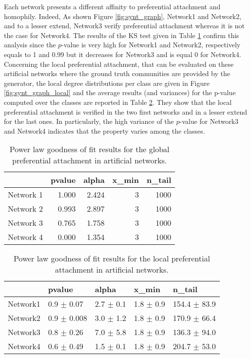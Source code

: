 \documentclass[a4paper, 12pt]{article}
\newcommand*{\lpath}{./}%
\begin{document}
Each network presents a different affinity to preferential attachment and homophily.
Indeed, As shown Figure \ref{fig:synt_graph}, Network1 and Network2, and to a lesser extend, Network3 verify preferential attachment whereas it is not the case for Network4. The results of the KS test given in Table \ref{table:synt_graph} confirm this analysis since the $p$-value is very high for Network1 and Network2, respectively equals to 1 and 0.99 but it decreases for Network3 and is equal 0 for Network4.
Concerning the local preferential attachment, that can be evaluated on these artificial networks where the ground truth communities are provided by the generator, the local degree distributions per class are given in Figure \ref{fig:synt_graph_local} and the average results (and variances) for the p-value computed over the classes are reported in Table \ref{table:synt_graph_local}. They show that the local preferential attachment is verified in the two first networks and in a lesser extend for the  last ones. In particularly, the high variance of the $p$-value for Network3 and Network4 indicates that the property varies among the classes.




\begin{table}[h]
\caption{Power law goodness of fit results for the global preferential attachment in artificial networks.}
\centering
  \begin{tabular}{lrrrr}
  	\hline
  	&   pvalue &   alpha &   x\_min &   n\_tail \\
  	\hline
  	Network 1 &    1.000 &   2.424 &       3 &     1000 \\
  	Network 2 &    0.993 &   2.897 &       3 &     1000 \\
  	Network 3 &    0.765 &   1.758 &       3 &     1000 \\
  	Network 4 &    0.000 &   1.354 &       3 &     1000 \\
  	\hline
  \end{tabular}
\label{table:synt_graph}
\end{table}

\begin{table}[h]
\caption{Power law goodness of fit results for the local preferential attachment in artificial networks.}
\centering
    \begin{tabular}{lllll}
    \hline
    & pvalue          & alpha           & x\_min        & n\_tail           \\
    \hline
    Network1 & 0.9 $\pm$ 0.07  & 2.7 $\pm$ 0.1 & 1.8 $\pm$ 0.9 & 154.4 $\pm$ 83.9 \\
    Network2 & 0.9 $\pm$ 0.008 & 3.0 $\pm$ 1.2  & 1.8 $\pm$ 0.9 & 170.9 $\pm$ 66.4  \\
    Network3 & 0.8 $\pm$ 0.26 & 7.0 $\pm$ 5.8 & 1.8 $\pm$ 0.9 & 136.3 $\pm$ 94.0 \\
    Network4 & 0.6 $\pm$ 0.49    & 1.5 $\pm$ 0.1 & 1.8 $\pm$ 0.9 & 204.7 $\pm$ 53.0 \\
    \hline
    \end{tabular}
\label{table:synt_graph_local}
\end{table}
\end{document}
